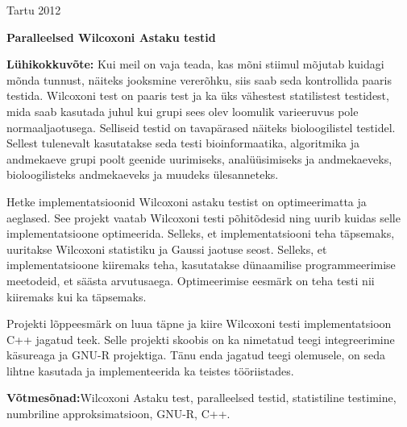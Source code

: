 \documentclass[12pt]{article}
\begin{document}
\vfill
\centerline{Tartu 2012}

\newpage
\thispagestyle{empty}
\phantom{Text to fill the page}

\newpage

\noindent\textbf{\large Paralleelsed Wilcoxoni Astaku testid}
\vspace*{3ex}

\noindent\textbf{Lühikokkuvõte:}
Kui meil on vaja teada, kas mõni stiimul mõjutab kuidagi mõnda tunnust, näiteks jooksmine vererõhku, siis saab seda kontrollida paaris testida. Wilcoxoni test on paaris test ja ka üks vähestest statilistest testidest, mida saab kasutada juhul kui grupi sees olev loomulik varieeruvus pole normaaljaotusega. Selliseid testid on tavapärased näiteks bioloogilistel testidel. Sellest tulenevalt kasutatakse seda testi bioinformaatika, algoritmika ja andmekaeve grupi poolt geenide uurimiseks, analüüsimiseks ja andmekaeveks, bioloogilisteks andmekaeveks ja muudeks ülesanneteks.

Hetke implementatsioonid Wilcoxoni astaku testist on optimeerimatta ja aeglased. See projekt vaatab Wilcoxoni testi põhitõdesid ning uurib kuidas selle implementatsioone optimeerida. Selleks, et implementatsiooni teha täpsemaks, uuritakse Wilcoxoni statistiku ja Gaussi jaotuse seost. Selleks, et implementatsioone kiiremaks teha, kasutatakse dünaamilise programmeerimise meetodeid, et säästa arvutusaega. Optimeerimise eesmärk on teha testi nii kiiremaks kui ka täpsemaks.

Projekti lõppeesmärk on luua täpne ja kiire Wilcoxoni testi implementatsioon C++ jagatud teek. Selle projekti skoobis on ka nimetatud teegi integreerimine käsureaga ja GNU-R projektiga. Tänu enda jagatud teegi olemusele, on seda lihtne kasutada ja implementeerida ka teistes tööriistades.
\vspace*{3ex}

\noindent\textbf{Võtmesõnad:}{Wilcoxoni Astaku test, paralleelsed testid, statistiline testimine, numbriline approksimatsioon, GNU-R, C++.}
\vspace*{6ex}
\end{document}
